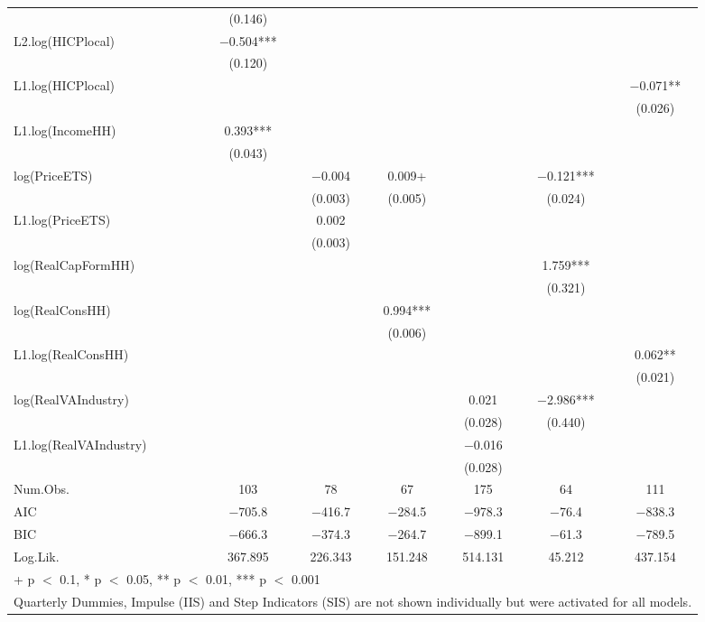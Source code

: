 \begin{table}
{\begin{tabular}[t]{lcccccc}
 & (\num{0.146}) &  &  &  &  & \\
L2.log(HICPlocal) & \num{-0.504}*** &  &  &  &  & \\
 & (\num{0.120}) &  &  &  &  & \\
L1.log(HICPlocal) &  &  &  &  &  & \num{-0.071}**\\
 &  &  &  &  &  & (\num{0.026})\\
L1.log(IncomeHH) & \num{0.393}*** &  &  &  &  & \\
 & (\num{0.043}) &  &  &  &  & \\
log(PriceETS) &  & \num{-0.004} & \num{0.009}+ &  & \num{-0.121}*** & \\
 &  & (\num{0.003}) & (\num{0.005}) &  & (\num{0.024}) & \\
L1.log(PriceETS) &  & \num{0.002} &  &  &  & \\
 &  & (\num{0.003}) &  &  &  & \\
log(RealCapFormHH) &  &  &  &  & \num{1.759}*** & \\
 &  &  &  &  & (\num{0.321}) & \\
log(RealConsHH) &  &  & \num{0.994}*** &  &  & \\
 &  &  & (\num{0.006}) &  &  & \\
L1.log(RealConsHH) &  &  &  &  &  & \num{0.062}**\\
 &  &  &  &  &  & (\num{0.021})\\
log(RealVAIndustry) &  &  &  & \num{0.021} & \num{-2.986}*** & \\
 &  &  &  & (\num{0.028}) & (\num{0.440}) & \\
L1.log(RealVAIndustry) &  &  &  & \num{-0.016} &  & \\
 &  &  &  & (\num{0.028}) &  & \\
\midrule
Num.Obs. & \num{103} & \num{78} & \num{67} & \num{175} & \num{64} & \num{111}\\
AIC & \num{-705.8} & \num{-416.7} & \num{-284.5} & \num{-978.3} & \num{-76.4} & \num{-838.3}\\
BIC & \num{-666.3} & \num{-374.3} & \num{-264.7} & \num{-899.1} & \num{-61.3} & \num{-789.5}\\
Log.Lik. & \num{367.895} & \num{226.343} & \num{151.248} & \num{514.131} & \num{45.212} & \num{437.154}\\
\bottomrule
\multicolumn{7}{l}{\rule{0pt}{1em}+ p $<$ 0.1, * p $<$ 0.05, ** p $<$ 0.01, *** p $<$ 0.001}\\
\multicolumn{7}{l}{\rule{0pt}{1em}Quarterly Dummies, Impulse (IIS) and Step Indicators (SIS) are not shown individually but were activated for all models.}\\
\end{tabular}}
\end{table}


